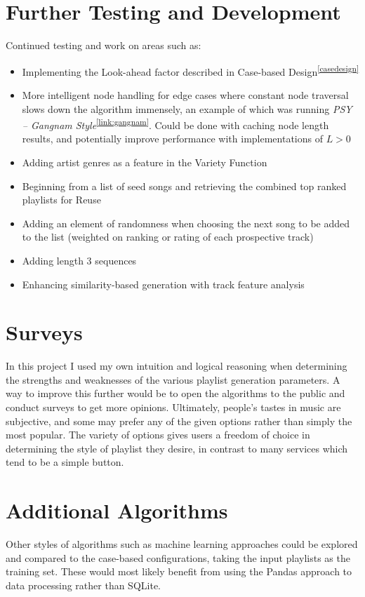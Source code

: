 \documentclass[a4paper, 12pt]{report}
\begin{document}
\section{Further Testing and Development}
Continued testing and work on areas such as:
\begin{itemize}
    \item Implementing the Look-ahead factor described in Case-based Design\textsuperscript{\ref{casedesign}}
    \item More intelligent node handling for edge cases where constant node traversal slows down the algorithm immensely, an example of which was running \textit{PSY -- Gangnam Style}\textsuperscript{\ref{link:gangnam}}.
    Could be done with caching node length results, and potentially improve performance with implementations of \(L > 0\)
    \item Adding artist genres as a feature in the Variety Function
    \item Beginning from a list of seed songs and retrieving the combined top ranked playlists for Reuse
    \item Adding an element of randomness when choosing the next song to be added to the list (weighted on ranking or rating of each prospective track)
    \item Adding length 3 sequences
    \item Enhancing similarity-based generation with track feature analysis
\end{itemize}

\section{Surveys}
In this project I used my own intuition and logical reasoning when determining the strengths and weaknesses of the various playlist generation parameters.
A way to improve this further would be to open the algorithms to the public and conduct surveys to get more opinions. Ultimately, people's tastes in music
are subjective, and some may prefer any of the given options rather than simply the most popular. The variety of options gives users a freedom of choice in
determining the style of playlist they desire, in contrast to many services which tend to be a simple button.

\section{Additional Algorithms}
Other styles of algorithms such as machine learning approaches could be explored and compared to the case-based configurations, taking the input playlists as the training set.
These would most likely benefit from using the Pandas approach to data processing rather than SQLite.
\end{document}
